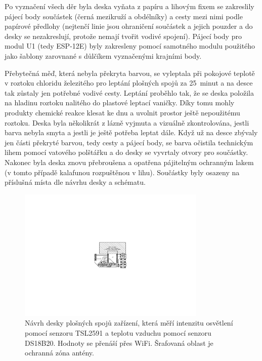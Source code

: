         Po vyznačení všech děr byla deska vyňata z papíru a lihovým fixem se zakreslily pájecí body součástek (černá mezikruží a obdélníky) a cesty mezi nimi podle papírové předlohy (nejtenčí linie jsou ohraničení součástek a jejich pouzder a do desky se nezakreslují, protože nemají tvořit vodivé spojení). Pájecí body pro modul U1 (tedy ESP-12E) byly zakresleny pomocí samotného modulu použitého jako šablony zarovnané s důlčíkem vyznačenými krajními body.
        
        Přebytečná měď, která nebyla překryta barvou, se vyleptala při pokojové teplotě v roztoku chloridu železitého pro leptání plošných spojů za 25~minut a na desce tak zůstaly jen potřebné vodivé cesty. Leptání proběhlo tak, že se deska položila na hladinu roztoku nalitého do plastové leptací vaničky. Díky tomu mohly produkty chemické reakce klesat ke dnu a uvolnit prostor ještě nepoužitému roztoku. Deska byla několikrát z lázně vyjmuta a vizuálně zkontrolována, jestli barva nebyla smyta a jestli je ještě potřeba leptat dále. Když už na desce zbývaly jen části překryté barvou, tedy cesty a pájecí body, se barva očistila technickým lihem pomocí vatového polštářku a do desky se vyvrtaly otvory pro součástky. Nakonec byla deska znovu přebroušena a opatřena pájitelným ochranným lakem (v tomto případě kalafunou rozpuštěnou v lihu). Součástky byly osazeny na příslušná místa dle návrhu desky a schématu.
        \begin{figure}
            \centering
            \includegraphics[draft=\draftfig,width=0.8\textwidth,trim={11.8cm 8.2cm 11.8cm 9.7cm},clip]{img/hw/esp_lux_temp_dps.pdf}
            \caption[Návrh \acrshort{dps} měřicích zařízení]{Návrh desky plošných spojů zařízení, která měří intenzitu osvětlení pomocí senzoru TSL2591 a teplotu vzduchu pomocí senzoru DS18B20. Hodnoty se přenáší přes WiFi. Šrafovaná oblast je ochranná zóna antény.}
            \label{fig:dps}
        \end{figure}
